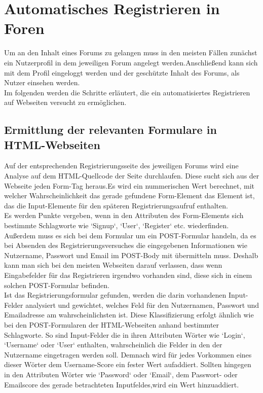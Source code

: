 \section {Automatisches Registrieren in Foren}
Um an den Inhalt eines Forums zu gelangen muss in den meisten Fällen zunächst ein Nutzerprofil in dem jeweiligen Forum angelegt werden.Anschließend kann sich mit dem Profil eingeloggt werden und der geschützte Inhalt des Forums, als Nutzer einsehen werden. \\
Im folgenden werden die Schritte erläutert, die ein automatisiertes Registrieren auf Webseiten versucht zu ermöglichen.
\subsection{Ermittlung der relevanten Formulare in HTML-Webseiten}
Auf der entsprechenden Registrierungsseite des jeweiligen Forums wird eine Analyse auf dem HTML-Quellcode der Seite durchlaufen.
Diese sucht sich aus der Webseite jeden Form-Tag heraus.Es wird ein nummerischen Wert berechnet, mit welcher Wahrscheinlichkeit das gerade gefundene Form-Element das Element ist, das die Input-Elemente für den späteren Registrierungsaufruf enthalten. \\
Es werden Punkte vergeben, wenn in den Attributen des Form-Elements sich bestimmte Schlagworte wie `Signup`, `User`, `Register` etc. wiederfinden. Außerdem muss es sich bei dem Formular um ein POST-Formular handeln, da es bei Absenden des Registrierungsversuches die eingegebenen Informationen wie Nutzername, Passwort und Email im POST-Body mit übermitteln muss.
Deshalb kann man sich bei den meisten Webseiten darauf verlassen, dass wenn Eingabefelder für das Registrieren irgendwo vorhanden sind, diese sich in einem solchen POST-Formular befinden.\\
Ist das Registrierungsformular gefunden, werden die darin vorhandenen Input-Felder analysiert und gewichtet, welches Feld für den Nutzernamen, Passwort und Emailadresse am wahrscheinlichsten ist.
Diese Klassifizierung erfolgt ähnlich wie bei den POST-Formularen der HTML-Webseiten anhand bestimmter Schlagworte.
So sind Input-Felder die in ihren Attributen Wörter wie `Login`, `Username` oder `User` enthalten, wahrscheinlich die Felder in den der Nutzername eingetragen werden soll. Demnach wird für jedes Vorkommen eines dieser Wörter dem Username-Score ein fester Wert aufaddiert. Sollten hingegen in den Attributen Wörter wie `Password` oder `Email`, dem Passwort- oder Emailscore des gerade betrachteten Inputfeldes,wird ein Wert hinzuaddiert.
